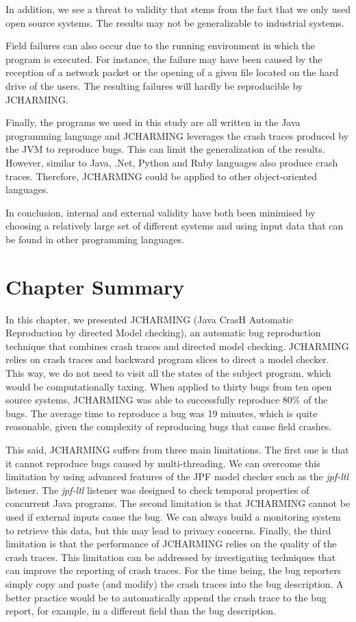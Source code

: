 \documentclass[12pt]{report}
\begin{document}
In addition, we see a threat to validity that stems from the fact that
we only used open source systems. The results may not be generalizable
to industrial systems.

Field failures can also occur due to the running environment in which
the program is executed. For instance, the failure may have been caused
by the reception of a network packet or the opening of a given file
located on the hard drive of the users. The resulting failures will
hardly be reproducible by JCHARMING.

Finally, the programs we used in this study are all written in the Java
programming language and JCHARMING leverages the crash traces produced
by the JVM to reproduce bugs. This can limit the generalization of the
results. However, similar to Java, .Net, Python and Ruby languages also
produce crash traces. Therefore, JCHARMING could be applied to other
object-oriented languages.

In conclusion, internal and external validity have both been minimised
by choosing a relatively large set of different systems and using input
data that can be found in other programming languages.

\section{\texorpdfstring{Chapter
Summary\label{sec:conclusion}}{Chapter Summary}}\label{chapter-summary-4}

In this chapter, we presented JCHARMING (Java CrasH Automatic
Reproduction by directed Model checking), an automatic bug reproduction
technique that combines crash traces and directed model checking.
JCHARMING relies on crash traces and backward program slices to direct a
model checker. This way, we do not need to visit all the states of the
subject program, which would be computationally taxing. When applied to
thirty bugs from ten open source systems, JCHARMING was able to
successfully reproduce 80\% of the bugs. The average time to reproduce a
bug was 19 minutes, which is quite reasonable, given the complexity of
reproducing bugs that cause field crashes.

This said, JCHARMING suffers from three main limitations. The first one
is that it cannot reproduce bugs caused by multi-threading. We
can overcome this limitation by using advanced features of the JPF model
checker such as the \emph{jpf-ltl} listener. The \emph{jpf-ltl} listener
was designed to check temporal properties of concurrent Java programs.
The second limitation is that JCHARMING cannot be used if external
inputs cause the bug. We can always build a monitoring system to
retrieve this data, but this may lead to privacy concerns. Finally, the
third limitation is that the performance of JCHARMING relies on the
quality of the crash traces. This limitation can be addressed by
investigating techniques that can improve the reporting of crash traces.
For the time being, the bug reporters simply copy and paste (and modify)
the crash traces into the bug description. A better practice would be to
automatically append the crash trace to the bug report, for example, in
a different field than the bug description.
\end{document}
